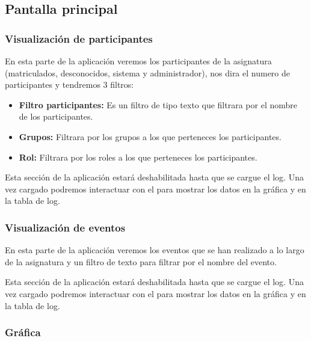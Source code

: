 \subsection{Pantalla principal}


\subsubsection{Visualización de participantes}

En esta parte de la aplicación veremos los participantes de la asignatura (matriculados, desconocidos, sistema y administrador), nos dira el numero de participantes y tendremos 3 filtros:


\begin{itemize}
	\tightlist
	\item
	\textbf{Filtro participantes:} Es un filtro de tipo texto que filtrara por el nombre de los participantes.
	\item
	\textbf{Grupos:} Filtrara por los grupos a los que perteneces los participantes.
	\item
	\textbf{Rol:} Filtrara por los roles a los que perteneces los participantes.
	
\end{itemize}



Esta sección de la aplicación estará deshabilitada hasta que se cargue el log. Una vez cargado podremos interactuar con el para mostrar los datos en la gráfica y en la tabla de log.

\subsubsection{Visualización de eventos}

En esta parte de la aplicación veremos los eventos que se han realizado a lo largo de la asignatura y un filtro de texto para filtrar por el nombre del evento.



Esta sección de la aplicación estará deshabilitada hasta que se cargue el log. Una vez cargado podremos interactuar con el para mostrar los datos en la gráfica y en la tabla de log.

\subsubsection{Gráfica}

